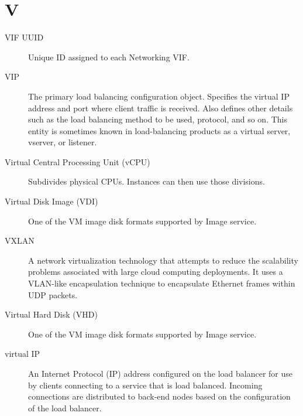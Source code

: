 \documentclass[letterpaper,10pt,english]{sphinxmanual}
\begin{document}
\section{V}
\label{_source/glossary:v}\begin{description}
\item[{VIF UUID}] \leavevmode{}\label{_source/glossary:term-vif-uuid}
Unique ID assigned to each Networking VIF.

\item[{VIP}] \leavevmode{}\label{_source/glossary:term-vip}
The primary load balancing configuration object.
Specifies the virtual IP address and port where client traffic
is received. Also defines other details such as the load
balancing method to be used, protocol, and so on. This entity
is sometimes known in load-balancing products as a virtual
server, vserver, or listener.

\item[{Virtual Central Processing Unit (vCPU)}] \leavevmode{}\label{_source/glossary:term-virtual-central-processing-unit-vcpu}
Subdivides physical CPUs. Instances can then use those
divisions.

\item[{Virtual Disk Image (VDI)}] \leavevmode{}\label{_source/glossary:term-virtual-disk-image-vdi}
One of the VM image disk formats supported by Image
service.

\item[{VXLAN}] \leavevmode{}\label{_source/glossary:term-vxlan}
A network virtualization technology that attempts to reduce the
scalability problems associated with large cloud computing
deployments. It uses a VLAN-like encapsulation technique to
encapsulate Ethernet frames within UDP packets.

\item[{Virtual Hard Disk (VHD)}] \leavevmode{}\label{_source/glossary:term-virtual-hard-disk-vhd}
One of the VM image disk formats supported by Image
service.

\item[{virtual IP}] \leavevmode{}\label{_source/glossary:term-virtual-ip}
An Internet Protocol (IP) address configured on the load
balancer for use by clients connecting to a service that is load
balanced. Incoming connections are distributed to back-end nodes based
on the configuration of the load balancer.


\end{description}
\end{document}
